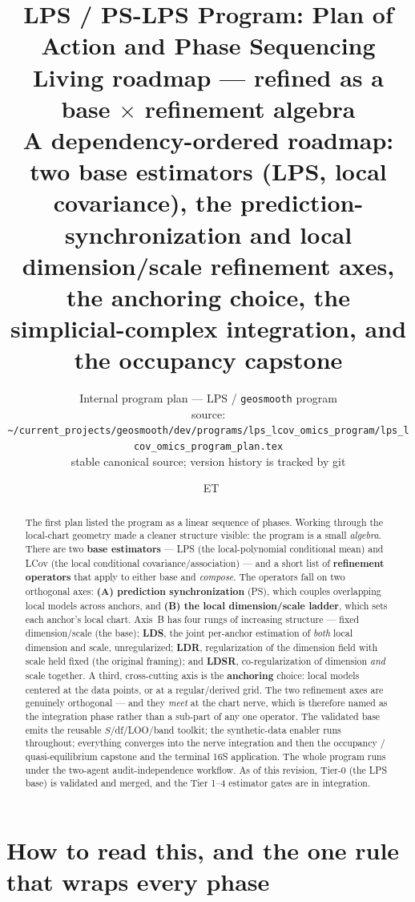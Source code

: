 \documentclass[11pt]{article}
\title{\textbf{LPS / PS-LPS Program: Plan of Action and Phase Sequencing}\\[3pt]
\large \textnormal{Living roadmap --- refined as a base $\times$ refinement algebra}\\[4pt]
\normalsize A dependency-ordered roadmap: two base estimators (LPS, local
covariance), the prediction-synchronization and local dimension/scale refinement
axes, the anchoring choice, the simplicial-complex integration, and the occupancy
capstone}
\author{\small Internal program plan --- LPS / \texttt{geosmooth} program\\[2pt]
\footnotesize source: \nolinkurl{~/current_projects/geosmooth/dev/programs/lps_lcov_omics_program/lps_lcov_omics_program_plan.tex}\\[1pt]
\footnotesize stable canonical source; version history is tracked by git}
\date{\DTMnow\ \textnormal{\footnotesize ET}}
\begin{document}
\maketitle

\begin{abstract}\noindent
The first plan listed the program as a linear sequence of phases. Working through
the local-chart geometry made a cleaner structure visible: the program is a small
\emph{algebra}. There are two \textbf{base estimators} --- LPS (the local-polynomial
conditional mean) and LCov (the local conditional covariance/association) --- and a
short list of \textbf{refinement operators} that apply to either base and
\emph{compose}. The operators fall on two orthogonal axes: \textbf{(A) prediction
synchronization} (PS), which couples overlapping local models across anchors, and
\textbf{(B) the local dimension/scale ladder}, which sets each anchor's local chart.
Axis~B has four rungs of increasing structure --- fixed dimension/scale (the base);
\textbf{LDS}, the joint per-anchor estimation of \emph{both} local dimension and
scale, unregularized; \textbf{LDR}, regularization of the dimension field with scale
held fixed (the original framing); and \textbf{LDSR}, co-regularization of dimension
\emph{and} scale together. A third, cross-cutting axis is the \textbf{anchoring}
choice: local models centered at the data points, or at a regular/derived grid. The
two refinement axes are genuinely orthogonal --- and they \emph{meet} at the chart
nerve, which is therefore named as the integration phase rather than a sub-part of
any one operator. The validated base emits the reusable $S$/df/LOO/band toolkit; the
synthetic-data enabler runs throughout; everything converges into the nerve
integration and then the occupancy / quasi-equilibrium capstone and the terminal
16S application. The whole program runs under the two-agent audit-independence
workflow. As of this revision, Tier-0 (the LPS base) is validated and merged, and the
Tier 1--4 estimator gates are in integration.
\end{abstract}

{\small\tableofcontents}

\section{How to read this, and the one rule that wraps every phase}\label{sec:read}
\end{document}
